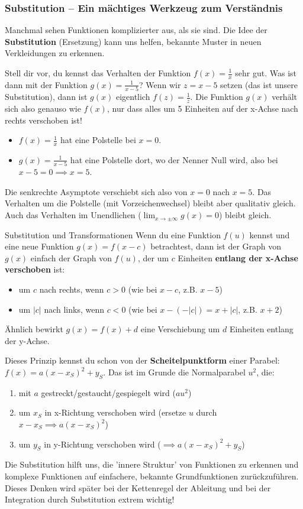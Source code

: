 \subsubsection{Substitution – Ein mächtiges Werkzeug zum Verständnis}

Manchmal sehen Funktionen komplizierter aus, als sie sind. Die Idee der \textbf{Substitution} (Ersetzung) kann uns helfen, bekannte Muster in neuen Verkleidungen zu erkennen.

Stell dir vor, du kennst das Verhalten der Funktion $f(x) = \frac{1}{x}$ sehr gut. Was ist dann mit der Funktion $g(x) = \frac{1}{x-5}$?
Wenn wir $z = x-5$ setzen (das ist unsere Substitution), dann ist $g(x)$ eigentlich $f(z) = \frac{1}{z}$. Die Funktion $g(x)$ verhält sich also genauso wie $f(x)$, nur dass alles um 5 Einheiten auf der x-Achse nach rechts verschoben ist!
\begin{itemize}
    \item $f(x) = \frac{1}{x}$ hat eine Polstelle bei $x=0$.
    \item $g(x) = \frac{1}{x-5}$ hat eine Polstelle dort, wo der Nenner Null wird, also bei $x-5=0 \implies x=5$.
\end{itemize}
Die senkrechte Asymptote verschiebt sich also von $x=0$ nach $x=5$. Das Verhalten um die Polstelle (mit Vorzeichenwechsel) bleibt aber qualitativ gleich. Auch das Verhalten im Unendlichen ($\lim_{x \to \pm\infty} g(x) = 0$) bleibt gleich.

\begin{merksatzumgebung}{Substitution und Transformationen}
Wenn du eine Funktion $f(u)$ kennst und eine neue Funktion $g(x) = f(x-c)$ betrachtest, dann ist der Graph von $g(x)$ einfach der Graph von $f(u)$, der um $c$ Einheiten \textbf{entlang der x-Achse verschoben} ist:
\begin{itemize}
    \item um $c$ nach rechts, wenn $c>0$ (wie bei $x-c$, z.B. $x-5$)
    \item um $|c|$ nach links, wenn $c<0$ (wie bei $x-(-|c|) = x+|c|$, z.B. $x+2$)
\end{itemize}
Ähnlich bewirkt $g(x) = f(x) + d$ eine Verschiebung um $d$ Einheiten entlang der y-Achse.

Dieses Prinzip kennst du schon von der \textbf{Scheitelpunktform} einer Parabel:
$f(x) = a(x-x_S)^2 + y_S$.
Das ist im Grunde die Normalparabel $u^2$, die:
\begin{enumerate}
    \item mit $a$ gestreckt/gestaucht/gespiegelt wird ($a u^2$)
    \item um $x_S$ in x-Richtung verschoben wird (ersetze $u$ durch $x-x_S \implies a(x-x_S)^2$)
    \item um $y_S$ in y-Richtung verschoben wird ($\implies a(x-x_S)^2 + y_S$)
\end{enumerate}
Die Substitution hilft uns, die 'innere Struktur' von Funktionen zu erkennen und komplexe Funktionen auf einfachere, bekannte Grundfunktionen zurückzuführen. Dieses Denken wird später bei der Kettenregel der Ableitung und bei der Integration durch Substitution extrem wichtig!
\end{merksatzumgebung}

